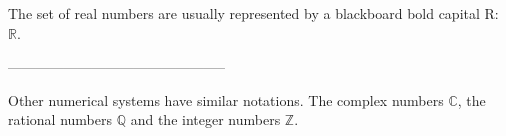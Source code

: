 \documentclass{article}
\begin{document}
	\newcommand{\R}{\mathbb{R}}
	The set of real numbers are usually represented 
	by a blackboard bold capital R: \( \R \).
	
	-----------------------------------------------
	
	\newcommand{\bb}[1]{\mathbb{#1}}
	Other numerical systems have similar notations. 
	The complex numbers \( \bb{C} \), the rational 
	numbers \( \bb{Q} \) and the integer numbers \( \bb{Z} \).
	
\end{document}
